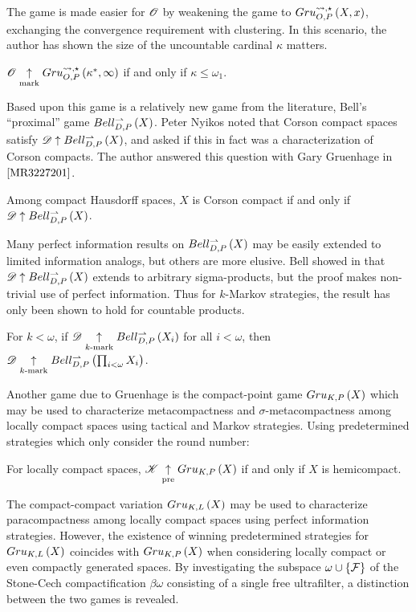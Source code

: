 The game is made easier for $\mathscr{O}$ by weakening the game to
$Gru_{O,P}^{\leadsto,\star}\left({X},{x}\right)$, exchanging the convergence requirement with
clustering. In this scenario, the author has shown the size of the
uncountable cardinal $\kappa$ matters.

\begin{thm*}
  $\mathscr{O}\underset{\text{mark}}{\uparrow}Gru_{O,P}^{\leadsto,\star}\left({\kappa^*},{\infty}\right)$ if and only if
  $\kappa\leq\omega_1$.
\end{thm*}

Based upon this game is a relatively new game from the literature,
Bell's ``proximal'' game $Bell_{D,P}^{\rightharpoonup}\left({X}\right)$. Peter Nyikos noted that
Corson compact spaces satisfy $\mathscr{D}\uparrow Bell_{D,P}^{\rightharpoonup}\left({X}\right)$, and asked if this
in fact was a characterization of Corson compacts. The author
answered this question with Gary Gruenhage in $\cite{MR3227201}$.

\begin{thm*}
  Among compact Hausdorff spaces, $X$ is Corson compact if and only if
  $\mathscr{D}\uparrow Bell_{D,P}^{\rightharpoonup}\left({X}\right)$.
\end{thm*}

Many perfect information results on $Bell_{D,P}^{\rightharpoonup}\left({X}\right)$ may be easily extended to
limited information analogs, but others are more elusive. Bell showed
in \cite{MR3239205} that $\mathscr{D}\uparrow Bell_{D,P}^{\rightharpoonup}\left({X}\right)$ extends to arbitrary
sigma-products, but the proof makes non-trivial use of perfect information.
Thus for $k$-Markov strategies, the result has only been shown to hold for
countable products.

\begin{thm*}
  For $k<\omega$, if $\mathscr{D}\underset{k\text{-mark}}{\uparrow}Bell_{D,P}^{\rightharpoonup}\left({X_i}\right)$ for all $i<\omega$,
  then $\mathscr{D}\underset{k\text{-mark}}{\uparrow}Bell_{D,P}^{\rightharpoonup}\left({\prod_{i<\omega} X_i}\right)$.
\end{thm*}

Another game due to Gruenhage is the compact-point game $Gru_{K,P}\left({X}\right)$
which may be used to characterize metacompactness and $\sigma$-metacompactness
among locally compact spaces using tactical and Markov strategies. Using
predetermined strategies which only consider the round number:

\begin{thm*}
  For locally compact spaces, $\mathscr{K}\underset{\text{pre}}{\uparrow}Gru_{K,P}\left({X}\right)$ if and only if
  $X$ is hemicompact.
\end{thm*}

The compact-compact variation $Gru_{K,L}\left({X}\right)$ may be used to characterize
paracompactness among locally compact spaces
using perfect information strategies.
However, the existence of winning predetermined strategies for $Gru_{K,L}\left({X}\right)$
coincides
with $Gru_{K,P}\left({X}\right)$ when considering locally compact or even compactly generated
spaces. By investigating the subspace $\omega\cup\{\mathcal{F}\}$ of the Stone-Cech
compactification $\beta\omega$ consisting of a single free ultrafilter,
a distinction between the two games is revealed.

